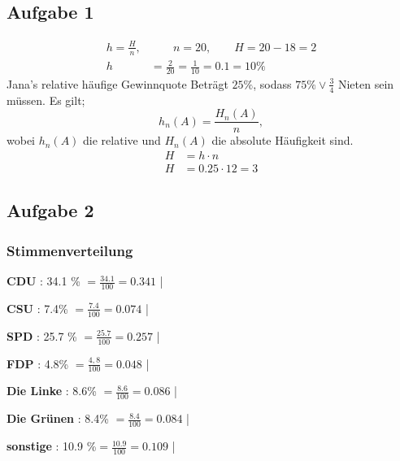 \documentclass[11pt,a4paper,oneside]{article}
\begin{document}
	\newpage
	
	\begin{loesung}{}
		\subsection*{Aufgabe 1}
		\begin{align*}
			h = \frac{H}{n}, &\qquad n = 20, \qquad H = 20 - 18 = 2 \\
			h  &= \frac{2}{20} = \boxed{ \frac{1}{10} = 0.1 = 10\%}
		\end{align*}
		Jana's relative häufige Gewinnquote Beträgt $25\%$, sodass $75\% \lor \frac{3}{4}$ Nieten sein müssen. Es gilt; 
		\[
		h_n(A) = \frac{H_n(A)}{n},
		\]
		wobei $h_n(A)$ die relative und $H_n(A)$ die absolute Häufigkeit sind. 
		\begin{align*}
			H &= h \cdot n\\
			H &= \boxed{0.25 \cdot 12 = 3}  
		\end{align*}
		\subsection*{Aufgabe 2}		
		\subsubsection*{Stimmenverteilung}
		\begin{inparaitem}
			\item [\textbf{CDU}] : 34.1 \% $= \frac{34.1}{100} = 0.341$ |
			\item [\textbf{CSU}] : 7.4\% $= \frac{7.4}{100} = 0.074$ |
			\item [\textbf{SPD}] : 25.7 \% $= \frac{25.7}{100} = 0.257$ |
			\item [\textbf{FDP}] : 4.8\% $= \frac{4,8}{100} = 0.048$ |
			\item [\textbf{Die Linke}] : 8.6\%  $= \frac{8.6}{100} = 0.086$ |
			\item [\textbf{Die Grünen}] : 8.4\% $= \frac{8.4}{100} = 0.084$ |
			\item [\textbf{sonstige}] : 10.9 \%$= \frac{10.9}{100} = 0.109$ |
		\end{inparaitem}\\ 

\end{loesung}
\end{document}
